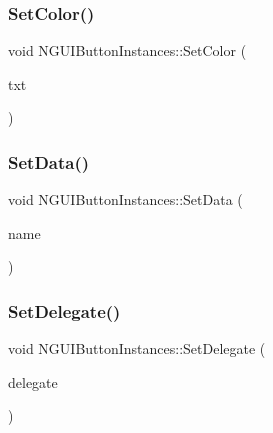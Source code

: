 \hypertarget{class_n_g_u_i_button_instances_a0157cd21350ab1ca86be0b6e790eaae6}{}\label{class_n_g_u_i_button_instances_a0157cd21350ab1ca86be0b6e790eaae6} 
\subsubsection{\texorpdfstring{Set\+Color()}{SetColor()}\hspace{0.1cm}{\footnotesize\ttfamily [2/2]}}
{\footnotesize\ttfamily void N\+G\+U\+I\+Button\+Instances\+::\+Set\+Color (\begin{DoxyParamCaption}\item[{string \&in}]{txt }\end{DoxyParamCaption})}

\hypertarget{class_n_g_u_i_button_instances_a522bcd2ab6a2836e78011e1facdf7600}{}\label{class_n_g_u_i_button_instances_a522bcd2ab6a2836e78011e1facdf7600} 
\subsubsection{\texorpdfstring{Set\+Data()}{SetData()}}
{\footnotesize\ttfamily void N\+G\+U\+I\+Button\+Instances\+::\+Set\+Data (\begin{DoxyParamCaption}\item[{string \&in}]{name }\end{DoxyParamCaption})}

\hypertarget{class_n_g_u_i_button_instances_ab2b614952387fb9d620f9e4585abc979}{}\label{class_n_g_u_i_button_instances_ab2b614952387fb9d620f9e4585abc979} 
\subsubsection{\texorpdfstring{Set\+Delegate()}{SetDelegate()}}
{\footnotesize\ttfamily void N\+G\+U\+I\+Button\+Instances\+::\+Set\+Delegate (\begin{DoxyParamCaption}\item[{N\+G\+U\+I\+Button\+Instances\+Delegate@}]{delegate }\end{DoxyParamCaption})}

